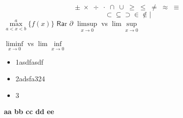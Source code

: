 \documentclass{article}
\begin{document}
	\[\pm\; \times \; \div\; \cdot\; \cap\; \cup\;
	\geq\; \leq\; \neq\; \approx \; \equiv \] 
	\[\subset \subseteq \supset  \in \notin \mid      \]
	$\max \limits_{a<x<b}^a \{f(x)\}$
$\mathsf{R} \mathsf{a} \mathrm{r}$ 	
	$\partial$
	$\limsup\limits_{x\rightarrow0}$ vs $\lim\sup\limits_{x\rightarrow0}$ 
	
	$\liminf\limits_{x\rightarrow0}$ vs $\lim\inf\limits_{x\rightarrow0}$
      \begin{itemize}
      \item 1asdfasdf
      \item 2adsfa324
      \item 3
     
      \end{itemize}
      \textbf{aa bb cc dd ee}
      
\end{document}
